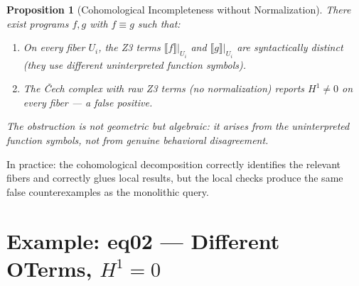 \documentclass[11pt,a4paper]{report}
\theoremstyle{definition}
\theoremstyle{plain}
\newtheorem{proposition}[definition]{Proposition}
\newcommand{\den}[1]{\llbracket #1 \rrbracket}
\newcommand{\Hone}{H^1}
\begin{document}
\begin{proposition}[Cohomological Incompleteness without Normalization]
\label{prop:coh-incomplete}
There exist programs $f, g$ with $f \equiv g$ such that:
\begin{enumerate}
  \item On every fiber $U_i$, the Z3 terms $\den{f}|_{U_i}$ and
    $\den{g}|_{U_i}$ are \emph{syntactically distinct} (they use
    different uninterpreted function symbols).
  \item The \v{C}ech complex with raw Z3 terms (no normalization)
    reports $\Hone \neq 0$ on every fiber --- a false positive.
\end{enumerate}
The obstruction is not geometric but \emph{algebraic}: it arises
from the uninterpreted function symbols, not from genuine behavioral
disagreement.
\end{proposition}

In practice: the cohomological decomposition correctly identifies the
relevant fibers and correctly glues local results, but the local
checks produce the same false counterexamples as the monolithic query.

\section{Example: eq02 --- Different OTerms, $\Hone = 0$}
\end{document}
